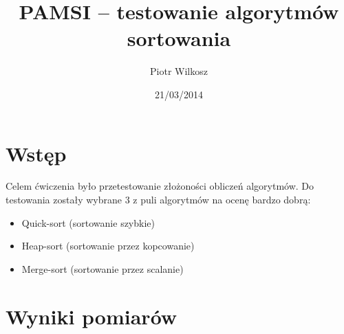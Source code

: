 \documentclass[a4paper,11pt]{article}
\date{21/03/2014}
\title{PAMSI -- testowanie algorytmów sortowania}
\author{Piotr Wilkosz}
\begin{document}
\maketitle



\section{Wstęp}
Celem ćwiczenia było przetestowanie złożoności obliczeń algorytmów. Do testowania zostały wybrane 3 z puli algorytmów na ocenę bardzo dobrą:
\begin{itemize}
 \item Quick-sort (sortowanie szybkie)
 \item Heap-sort (sortowanie przez kopcowanie)
 \item Merge-sort (sortowanie przez scalanie)
\end{itemize}

\section{Wyniki pomiarów}
\end{document}
